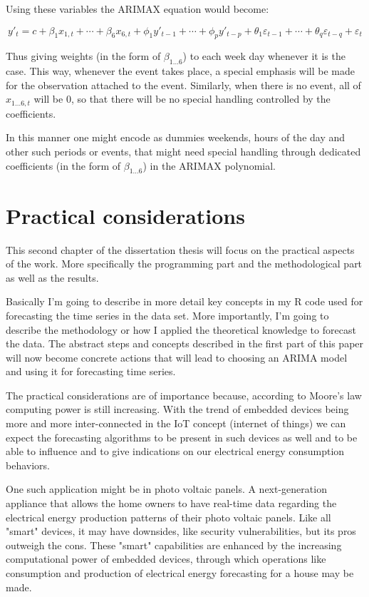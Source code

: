 \documentclass[12pt,a4paper,titlepage]{report}
\begin{document}
Using these variables the ARIMAX equation would become:

\[
y'_{t} = c + \beta_{1} x_{1,t} + \cdots + \beta_{6} x_{6,t} + \phi_{1}y'_{t-1} + \cdots + \phi_{p}y'_{t-p} + \theta_{1}\varepsilon_{t-1} + \cdots + \theta_{q}\varepsilon_{t-q} + \varepsilon_{t} 
\]

Thus giving weights (in the form of $ \beta_{1\dots6} $) to each week day whenever it is the case. This way, whenever the event takes place, a special emphasis will be made for the observation attached to the event. Similarly, when there is no event, all of $ x_{1\dots6,t} $ will be 0, so that there will be no special handling controlled by the coefficients.

In this manner one might encode as dummies weekends, hours of the day and other such periods or events, that might need special handling through dedicated coefficients (in the form of $ \beta_{1\dots6} $) in the ARIMAX polynomial.

\newpage
\chapter{Practical considerations}
This second chapter of the dissertation thesis will focus on the practical aspects of the work. More specifically the programming part and the methodological part as well as the results.

Basically I'm going to describe in more detail key concepts in my R code used for forecasting the time series in the data set.
More importantly, I'm going to describe the methodology or how I applied the theoretical knowledge to forecast the data. The abstract steps and concepts described in the first part of this paper will now become concrete actions that will lead to choosing an ARIMA model and using it for forecasting time series.

The practical considerations are of importance because, according to Moore's law \cite{moore:1965} computing power is still increasing. 
With the trend of embedded devices being more and more inter-connected in the IoT concept (internet of things) we can expect the forecasting algorithms to be present in such devices as well and to be able to influence and to give indications on our electrical energy consumption behaviors.

One such application might be in photo voltaic panels. A next-generation appliance that allows the home owners to have real-time data regarding the electrical energy production patterns of their photo voltaic panels. Like all "smart" devices, it may have downsides, like security vulnerabilities, but its pros outweigh the cons. These "smart" capabilities are enhanced by the increasing computational power of embedded devices, through which operations like consumption and production of electrical energy forecasting for a house may be made.
\end{document}
